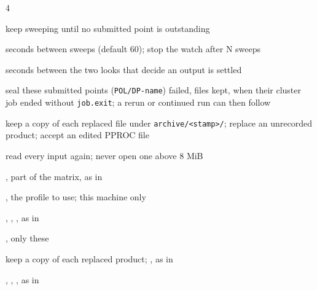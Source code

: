 \begin{multicols}{4}
\begin{flags}
\item {} keep sweeping until no submitted point is outstanding
\item {} seconds between sweeps (default 60);  stop the watch after N sweeps
\item {} seconds between the two looks that decide an output is settled
\item {} seal these submitted points (\texttt{POL/DP-name}) failed, files kept, when their cluster job ended without \texttt{job.exit}; a rerun or continued run can then follow
\item {} keep a copy of each replaced file under \texttt{archive/<stamp>/};  replace an unrecorded product;  accept an edited PPROC file
\item {} read every input again;  never open one above 8 MiB
\item {},  part of the matrix, as in 
\item {},  the profile to use; this machine only
\item {}, , ,  as in 
\end{flags}
\begin{flags}
\item {},  only these
\item {} keep a copy of each replaced product; ,  as in 
\item {}, , ,  as in 
\end{flags}


\end{multicols}
